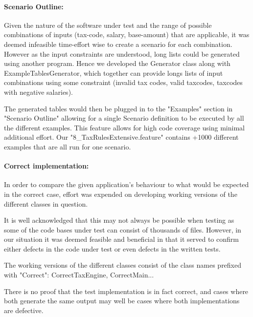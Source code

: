 \paragraph{Scenario Outline:}
Given the nature of the software under test and the range of possible combinations of inputs (tax-code, salary, base-amount) that are applicable, it was deemed infeasible time-effort wise to create a scenario for each combination. 
However as the input constraints are understood, long lists could be generated using another program. Hence we developed the Generator class along with ExampleTablesGenerator, which together can provide longs lists of input combinations using some constraint (invalid tax codes, valid taxcodes, taxcodes with negative salaries). 
\par 
The generated tables would then be plugged in to the "Examples" section in "Scenario Outline" allowing for a single Scenario definition to be executed by all the different examples. This feature allows for high code coverage using minimal additional effort. Our "8\_TaxRulesExtensive.feature" contains +1000 different examples that are all run for one scenario. 

\paragraph{Correct implementation:}
In order to compare the given application's behaviour to what would be expected in the correct case, effort was expended on developing working versions of the different classes in question. 
\par 
It is well acknowledged that this may not always be possible when testing as some of the code bases under test can consist of thousands of files. However, in our situation it was deemed feasible and beneficial in that it served to confirm either defects in the code under test or even defects in the written tests. 
\par 
The working versions of the different classes consist of the class names prefixed with "Correct": CorrectTaxEngine, CorrectMain... 
\par 
There is no proof that the test implementation is in fact correct, and cases where both generate the same output may well be cases where both implementations are defective.
